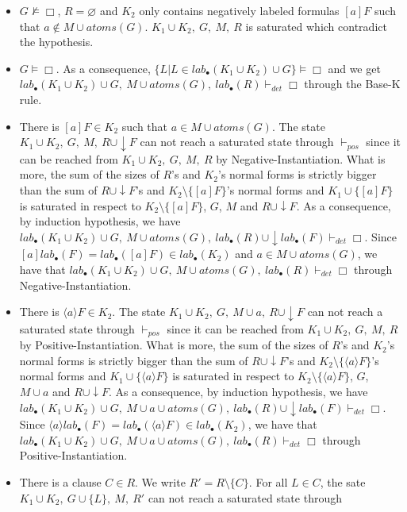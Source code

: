 \documentclass[a4paper,10pt]{report}
\newcommand{\atoms}{\mathit{atoms}}
\newcommand{\pos}{\vdash_\mathit{pos}}
\newcommand{\dett}{\vdash_\mathit{det}}
\newcommand{\T}{\mathit{lab}}
\begin{document}
\begin{itemize}
 \item $G\nvDash\Box$, $R=\varnothing$ and $K_2$ only contains negatively
labeled formulas $[a]F$ such that $a\notin M\cup \atoms(G)$. $K_1\cup K_2,\ G,\ M,\ R$ is saturated
which contradict the hypothesis.
 \item $G\vDash\Box$.
As a consequence, $\{L |L\in \T_\bullet(K_1\cup K_2)\cup G\}\vDash\Box$ and we get
$\T_\bullet(K_1\cup K_2)\cup G,\ M\cup\atoms(G),\ \T_\bullet(R)\dett\Box$ through the
{\sc Base-K} rule.
 \item There is $[a]F\in K_2$ such that $a\in M\cup \atoms(G)$.
The state $K_1\cup K_2,\ G,\ M,\ R\cup\downarrow F$ can not reach
a saturated state through $\pos$ since it can be reached from $K_1\cup K_2,\ G,\ M,\ R$ by
{\sc Negative-Instantiation}. What is more, the sum of the sizes of $R$'s and $K_2$'s normal forms
is strictly bigger than the sum of $R\cup\downarrow F$'s and $K_2\setminus\{[a]F\}$'s normal forms
and $K_1\cup\{[a]F\}$ is saturated in respect to $K_2\setminus\{[a]F\}$, $G$, $M$ and
$R\cup\downarrow F$. As a consequence,
by induction hypothesis, we have $\T_\bullet(K_1\cup K_2)\cup G,\ M\cup\atoms(G),\
\T_\bullet(R)\cup\downarrow \T_\bullet(F)\dett\Box$.
Since $[a]\T_\bullet(F)=\T_\bullet([a]F)\in \T_\bullet(K_2)$ and $a\in M\cup\atoms(G)$,
we have that $\T_\bullet(K_1\cup K_2)\cup G,\ M\cup\atoms(G),\ \T_\bullet(R)\dett\Box$
through {\sc Negative-Instantiation}.
 \item There is $\langle a\rangle F\in K_2$.
The state $K_1\cup K_2,\ G,\ M\cup a,\ R\cup\downarrow F$ can not
reach a saturated state through $\pos$ since it can be reached from $K_1\cup K_2,\ G,\ M,\ R$ by
{\sc Positive-Instantiation}. What is more, the sum of the sizes of $R$'s and $K_2$'s normal forms
is strictly bigger than the sum of $R\cup\downarrow F$'s and $K_2\setminus\{\langle a\rangle F\}$'s
normal forms and $K_1\cup\{\langle a\rangle F\}$ is saturated in respect to
$K_2\setminus\{\langle a\rangle F\}$, $G$, $M\cup a$ and $R\cup\downarrow F$. As a consequence,
by induction hypothesis, we have $\T_\bullet(K_1\cup K_2)\cup G,\ M\cup a\cup\atoms(G),\
\T_\bullet(R)\cup\downarrow \T_\bullet(F)\dett\Box$.
Since $\langle a\rangle \T_\bullet(F)=\T_\bullet(\langle a\rangle F)\in \T_\bullet(K_2)$,
we have that $\T_\bullet(K_1\cup K_2)\cup G,\ M\cup a\cup\atoms(G),\ \T_\bullet(R)\dett\Box$
through {\sc Positive-Instantiation}.
 \item There is a clause $C\in R$. We write $R'=R\setminus\{C\}$.
For all $L\in C$, the sate $K_1\cup K_2,\ G\cup\{L\},\ M,\ R'$ can not reach a saturated state through

\end{itemize}
\end{document}

